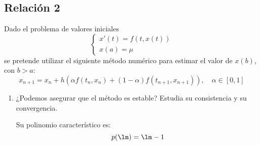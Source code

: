 \subsection{Relación 2}
\setcounter{ejercicio}{0}

\begin{ejercicio}
    Dado el problema de valores iniciales
    \begin{equation*}
        \begin{cases}
            x'(t) = f(t, x(t)) \\
            x(a) = \mu
        \end{cases}
    \end{equation*}
    se pretende utilizar el siguiente método numérico para estimar el valor de $x(b)$, con $b > a$:
    \begin{equation*}
        x_{n+1} = x_n + h \left( \alpha f(t_n, x_n) + (1 - \alpha) f(t_{n+1}, x_{n+1}) \right), \quad \alpha \in [0, 1]
    \end{equation*}
    \begin{enumerate}
        \item ¿Podemos asegurar que el método es estable? Estudia su consistencia y su convergencia.
        
        Su polinomio característico es:
        \begin{equation*}
            p(\lm) = \lm -1
        \end{equation*}


\end{enumerate}
\end{ejercicio}
